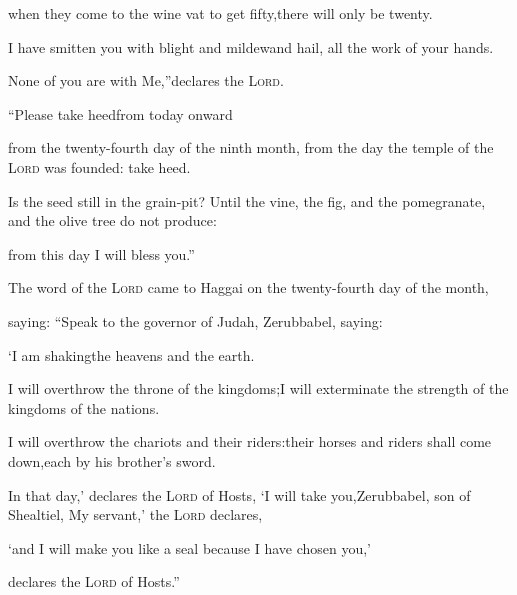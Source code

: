 \begin{inparaenum}
  \pa when they come to the wine vat to get fifty,\pa there will only be twenty.%
  
  \pa {} I have smitten you with blight and mildew\pa and hail, all the work of your hands.%
  
  \pa None of you are with Me,''\pa declares the \textsc{Lord}.%
  
  \pa {} ``Please take heed\pa from today onward%
  
  \pa from the twenty-fourth day of the ninth month, from the day the temple of the \textsc{Lord} was founded: take heed.%
  
  \pa {} Is the seed%
  still in the grain-pit?%
  \pa Until the vine, the fig, and the pomegranate,%
  \pa and the olive tree do not produce:%
  
  \pa from this day I will bless you.''%
  
  \pb {} The word of the \textsc{Lord} came to Haggai on the twenty-fourth day of the month,%
  
  \pa saying:  ``Speak to the governor of Judah, Zerubbabel, saying:%
  
  \pc `I am shaking\pa the heavens and the earth.%
  
  \pb {} I will overthrow the throne of the kingdoms;\pa I will exterminate the strength of the kingdoms%
  of the nations.%
  
  \pc I will overthrow the chariots and their riders:\pa their horses and riders shall come down,\pa each by his brother's sword.%
  
  \pc {} In that day,' declares the \textsc{Lord} of Hosts, `I will take you,\pa Zerubbabel, son of Shealtiel, My servant,' the \textsc{Lord} declares,%
  
  \pc `and I will make you like a seal%
  \pa because I have chosen you,'%
  
  \pd declares the \textsc{Lord} of Hosts.''%
\end{inparaenum}
